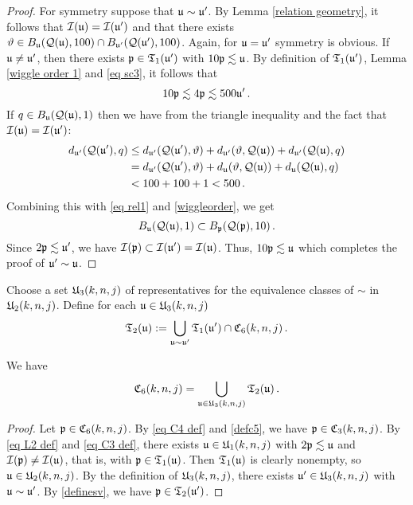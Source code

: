 {\begin{proof}
    For symmetry suppose that $\mathfrak u \sim \mathfrak u'$. By Lemma \eqref{relation geometry}, it follows that $\mathcal{I}(\mathfrak u) = \mathcal{I}(\mathfrak u')$ and that there exists $\vartheta \in B_{\mathfrak u}(\mathcal{Q}(\mathfrak u), 100) \cap B_{\mathfrak u'}(\mathcal{Q}(\mathfrak u'), 100)$. Again, for $\mathfrak u = \mathfrak u'$ symmetry is obvious. If $\mathfrak u \ne \mathfrak u'$, then there exists $\mathfrak p \in \mathfrak{T}_1(\mathfrak u')$ with $10\mathfrak p\lesssim \mathfrak u$. By definition of $\mathfrak{T}_1(\mathfrak u')$, Lemma \ref{wiggle order 1} and \eqref{eq sc3}, it follows that
    \begin{equation}
        \label{eq rel1}
        10\mathfrak p \lesssim 4\mathfrak p \lesssim 500 \mathfrak u'\,.
    \end{equation}
    If $q \in B_{\mathfrak u}(\mathcal{Q}(\mathfrak u),1)$ then we have from the triangle inequality and the fact that $\mathcal{I}(\mathfrak u) = \mathcal{I}(\mathfrak u')$:
    \begin{align*}
        d_{\mathfrak u'}(\mathcal{Q}(\mathfrak u'), q) &\le d_{\mathfrak u'}(\mathcal{Q}(\mathfrak u'), \vartheta) + d_{\mathfrak u'}(\vartheta, \mathcal{Q}(\mathfrak u)) + d_{\mathfrak u'}(\mathcal{Q}(\mathfrak u), q)\\
        &= d_{\mathfrak u'}(\mathcal{Q}(\mathfrak u'), \vartheta) + d_{\mathfrak u}(\vartheta, \mathcal{Q}(\mathfrak u)) + d_{\mathfrak u}(\mathcal{Q}(\mathfrak u), q)\\
        &< 100 + 100 + 1 < 500\,.
    \end{align*}
    Combining this with \eqref{eq rel1} and \eqref{wiggleorder}, we get
    \begin{equation*}
     B_{\mathfrak u}(\mathcal{Q}(\mathfrak u), 1) \subset B_{\mathfrak p}(\mathcal{Q}(\mathfrak p), 10)\, .
    \end{equation*}
    Since $2\mathfrak p \lesssim \mathfrak u'$, we have $\mathcal{I}(\mathfrak p) \subset \mathcal{I}(\mathfrak u') = \mathcal{I}(\mathfrak u)$. Thus, $10\mathfrak p \lesssim \mathfrak u$ which completes the proof of $\mathfrak u' \sim \mathfrak u$.
\end{proof}

Choose a set  $\mathfrak U_3(k,n,j)$ of representatives for the equivalence
classes of $\sim$ in $\mathfrak U_2(k,n,j)$.
Define for each $\mathfrak u\in \mathfrak U_3(k,n,j)$
\begin{equation}\label{definesv}
\mathfrak T_2(\mathfrak u):=
   \bigcup_{\mathfrak u\sim \mathfrak u'}\mathfrak{T}_1(\mathfrak u')\cap \mathfrak C_6(k,n,j)\, .
\end{equation}

\begin{lemma}
\label{C6 forest}
We have
\begin{equation}
    \mathfrak C_6(k,n,j)=\bigcup_{\mathfrak u\in \mathfrak U_3(k,n,j)}\mathfrak{T}_2(\mathfrak u)\, .
\end{equation}
\end{lemma}
\begin{proof}
    Let $\mathfrak p \in \mathfrak C_6(k,n,j)$.
    By \eqref{eq C4 def} and \eqref{defc5}, we have $\mathfrak p \in \mathfrak C_3(k,n,j)$. By \eqref{eq L2 def} and \eqref{eq C3 def}, there exists $\mathfrak u \in \mathfrak U_1(k,n,j)$ with $2\mathfrak p \lesssim \mathfrak u$ and $\mathcal{I}(\mathfrak p) \ne \mathcal{I}(\mathfrak u)$, that is, with $\mathfrak p \in \mathfrak{T}_1(\mathfrak u)$. Then $\mathfrak{T}_1(\mathfrak u)$ is clearly nonempty, so $\mathfrak u \in \mathfrak U_2(k,n,j)$. By the definition of $\mathfrak U_3(k,n,j)$, there exists $\mathfrak u' \in \mathfrak U_3(k,n,j)$ with $\mathfrak u \sim \mathfrak u'$. By \eqref{definesv}, we have $\mathfrak p \in \mathfrak{T}_2(\mathfrak u')$.
\end{proof}

}
